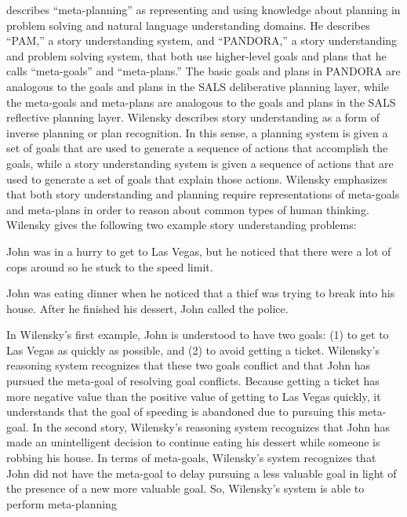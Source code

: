 \cite{wilensky:1981} describes ``meta-planning'' as representing and
using knowledge about planning in problem solving and natural language
understanding domains.  He describes ``PAM,'' a story understanding
system, and ``PANDORA,'' a story understanding and problem solving
system, that both use higher-level goals and plans that he calls
``meta-goals'' and ``meta-plans.''  The basic goals and plans in
PANDORA are analogous to the goals and plans in the SALS deliberative
planning layer, while the meta-goals and meta-plans are analogous to
the goals and plans in the SALS reflective planning layer.  Wilensky
describes story understanding as a form of inverse planning or plan
recognition.  In this sense, a planning system is given a set of goals
that are used to generate a sequence of actions that accomplish the
goals, while a story understanding system is given a sequence of
actions that are used to generate a set of goals that explain those
actions.  Wilensky emphasizes that both story understanding and
planning require representations of meta-goals and meta-plans in order
to reason about common types of human thinking.  Wilensky gives the
following two example story understanding problems:
\begin{packed_enumerate}
\item{John was in a hurry to get to Las Vegas, but he noticed that
  there were a lot of cops around so he stuck to the speed limit.}
\item{John was eating dinner when he noticed that a thief was trying
  to break into his house.  After he finished his dessert, John called
  the police.}
\end{packed_enumerate}
In Wilensky's first example, John is understood to have two goals: (1)
to get to Las Vegas as quickly as possible, and (2) to avoid getting a
ticket.  Wilensky's reasoning system recognizes that these two goals
conflict and that John has pursued the meta-goal of resolving goal
conflicts.  Because getting a ticket has more negative value than the
positive value of getting to Las Vegas quickly, it understands that
the goal of speeding is abandoned due to pursuing this meta-goal.  In
the second story, Wilensky's reasoning system recognizes that John has
made an unintelligent decision to continue eating his dessert while
someone is robbing his house.  In terms of meta-goals, Wilensky's
system recognizes that John did not have the meta-goal to delay
pursuing a less valuable goal in light of the presence of a new more
valuable goal.  So, Wilensky's system is able to perform meta-planning
